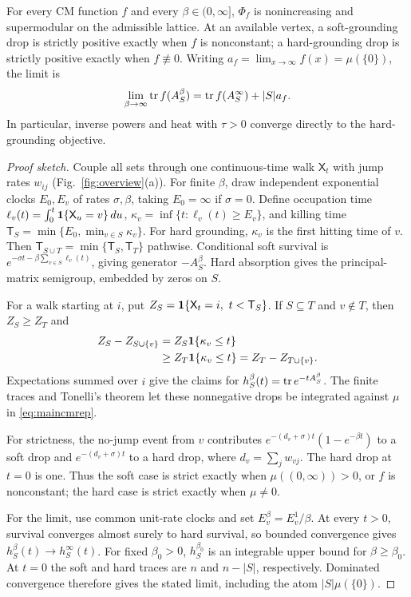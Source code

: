 \begin{theorem}\label{main:cm}
For every CM function $f$ and every $\beta\in(0,\infty]$,
$\Phi_f$ is nonincreasing and supermodular on the admissible
lattice. At an available vertex, a soft-grounding drop is strictly
positive exactly when $f$ is nonconstant; a hard-grounding drop
is strictly positive exactly when $f\not\equiv0$.
Writing $a_f=\lim_{x\to\infty}f(x)=\mu(\{0\})$, the limit is
\[
 \lim_{\beta\to\infty}\operatorname{tr} f(A_S^\beta)
 =\operatorname{tr} f(A_S^\infty)+|S|a_f.
\]
In particular, inverse powers and heat with $\tau>0$ converge
directly to the hard-grounding objective.
\end{theorem}
\begin{proof}[Proof sketch]
Couple all sets through one continuous-time walk $\mathsf X_t$
with jump rates $w_{ij}$ (Fig.~\ref{fig:overview}(a)). For finite
$\beta$, draw independent exponential clocks $E_0,E_v$ of rates
$\sigma,\beta$, taking $E_0=\infty$ if $\sigma=0$.
Define occupation time
$\ell_v(t)=\int_0^t\mathbf 1\{\mathsf X_u=v\}\,du$,
$\kappa_v=\inf\{t:\ell_v(t)\geq E_v\}$, and killing time
$\mathsf T_S=\min\{E_0,\min_{v\in S}\kappa_v\}$.
For hard grounding, $\kappa_v$ is the first hitting time of $v$.
Then $\mathsf T_{S\cup T}=\min\{\mathsf T_S,\mathsf T_T\}$
pathwise. Conditional soft survival is
$e^{-\sigma t-\beta\sum_{v\in S}\ell_v(t)}$, giving generator
$-A_S^\beta$. Hard absorption gives the principal-matrix
semigroup, embedded by zeros on $S$.

For a walk starting at $i$, put
$Z_S=\mathbf 1\{\mathsf X_t=i,\ t<\mathsf T_S\}$.
If $S\subseteq T$ and $v\notin T$, then $Z_S\geq Z_T$ and
\begin{align*}
 Z_S-Z_{S\cup\{v\}}&=Z_S\mathbf 1\{\kappa_v\leq t\}\\
 &\geq Z_T\mathbf 1\{\kappa_v\leq t\}=Z_T-Z_{T\cup\{v\}}.
\end{align*}
Expectations summed over $i$ give the claims for
$h_S^\beta(t)=\operatorname{tr} e^{-tA_S^\beta}$.
The finite traces and Tonelli's theorem let these nonnegative drops
be integrated against $\mu$ in \eqref{eq:maincmrep}.

For strictness, the no-jump event from $v$ contributes
$e^{-(d_v+\sigma)t}(1-e^{-\beta t})$ to a soft drop and
$e^{-(d_v+\sigma)t}$ to a hard drop, where $d_v=\sum_jw_{vj}$.
The hard drop at $t=0$ is one. Thus the soft case is strict exactly
when $\mu((0,\infty))>0$, or $f$ is nonconstant; the hard case
is strict exactly when $\mu\ne0$.

For the limit, use common unit-rate clocks and set
$E_v^\beta=E_v^1/\beta$. At every $t>0$, survival converges
almost surely to hard survival, so bounded convergence gives
$h_S^\beta(t)\to h_S^\infty(t)$.
For fixed $\beta_0>0$, $h_S^{\beta_0}$ is an integrable upper
bound for $\beta\geq\beta_0$. At $t=0$ the soft and hard traces
are $n$ and $n-|S|$, respectively. Dominated convergence therefore
gives the stated limit, including the atom $|S|\mu(\{0\})$.
\end{proof}

